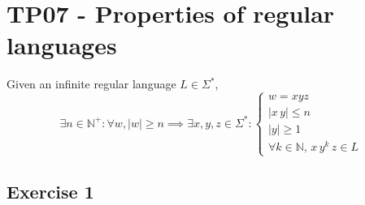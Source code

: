 \documentclass[docid=TP07]{tcom_TP}
\begin{document}
\setcounter{section}{6}
\section{TP07 - Properties of regular languages}
{
\renewcommand{\thesubsubsection}{\thesubsection\alph{subsubsection}}
\begin{lemma} \label{lem:pump}
Given an infinite regular language $L \in \Sigma^*$,
\begin{equation*}
	\exists n \in \mathbb{N}^+ \colon \forall w, |w|\geq n \implies \exists x, y, z \in \Sigma^* \colon 
	\begin{cases}
		w = xyz \\
		|x\,y| \leq n\\
		|y| \geq 1\\
		\forall k \in \mathbb{N},\,x\,y^k\,z \in L
	\end{cases}
\end{equation*} 
\end{lemma}
\subsection{Exercise 1}
}
\end{document}
